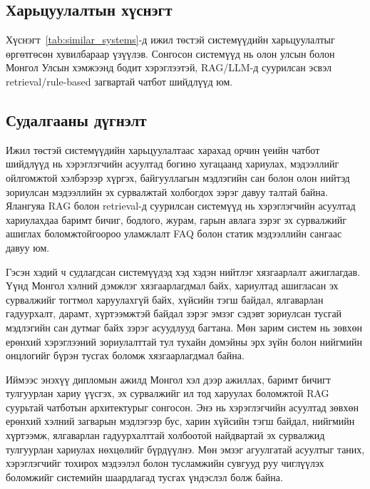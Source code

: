 \subsection{Харьцуулалтын хүснэгт}

Хүснэгт~\ref{tab:similar_systems}-д ижил төстэй системүүдийн харьцуулалтыг өргөтгөсөн хувилбараар үзүүлэв. Сонгосон системүүд нь олон улсын болон Монгол Улсын хэмжээнд бодит хэрэглээтэй, RAG/LLM-д суурилсан эсвэл retrieval/rule-based загвартай чатбот шийдлүүд юм.



\subsection{Судалгааны дүгнэлт}

Ижил төстэй системүүдийн харьцуулалтаас харахад орчин үеийн чатбот шийдлүүд нь хэрэглэгчийн асуултад богино хугацаанд хариулах, мэдээллийг ойлгомжтой хэлбэрээр хүргэх, байгууллагын мэдлэгийн сан болон олон нийтэд зориулсан мэдээллийн эх сурвалжтай холбогдох зэрэг давуу талтай байна. Ялангуяа RAG болон retrieval-д суурилсан системүүд нь хэрэглэгчийн асуултад хариулахдаа баримт бичиг, бодлого, журам, гарын авлага зэрэг эх сурвалжийг ашиглах боломжтойгоороо уламжлалт FAQ болон статик мэдээллийн сангаас давуу юм.

Гэсэн хэдий ч судлагдсан системүүдэд хэд хэдэн нийтлэг хязгаарлалт ажиглагдав. Үүнд Монгол хэлний дэмжлэг хязгаарлагдмал байх, хариултад ашигласан эх сурвалжийг тогтмол харуулахгүй байх, хүйсийн тэгш байдал, ялгаварлан гадуурхалт, дарамт, хүртээмжтэй байдал зэрэг эмзэг сэдэвт зориулсан тусгай мэдлэгийн сан дутмаг байх зэрэг асуудлууд багтана. Мөн зарим систем нь зөвхөн ерөнхий хэрэглээний зориулалттай тул тухайн домэйны эрх зүйн болон нийгмийн онцлогийг бүрэн тусгах боломж хязгаарлагдмал байна.

Иймээс энэхүү дипломын ажилд Монгол хэл дээр ажиллах, баримт бичигт тулгуурлан хариу үүсгэх, эх сурвалжийг ил тод харуулах боломжтой RAG суурьтай чатботын архитектурыг сонгосон. Энэ нь хэрэглэгчийн асуултад зөвхөн ерөнхий хэлний загварын мэдлэгээр бус, харин хүйсийн тэгш байдал, нийгмийн хүртээмж, ялгаварлан гадуурхалттай холбоотой найдвартай эх сурвалжид тулгуурлан хариулах нөхцөлийг бүрдүүлнэ. Мөн эмзэг агуулгатай асуултыг таних, хэрэглэгчийг тохирох мэдээлэл болон тусламжийн сувгууд руу чиглүүлэх боломжийг системийн шаардлагад тусгах үндэслэл болж байна.



